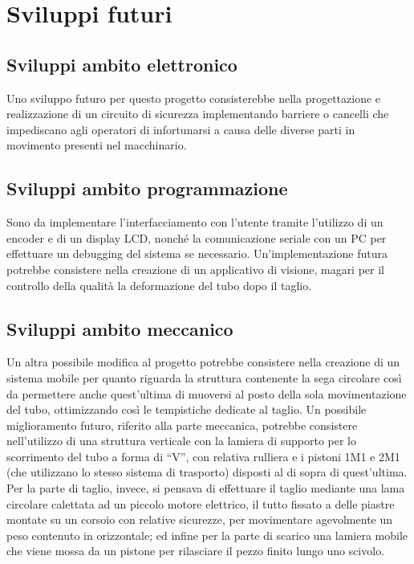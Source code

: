 \documentclass{report}
\begin{document}
\chapter{Sviluppi futuri}
\section{Sviluppi ambito elettronico}
  Uno sviluppo futuro per questo progetto consisterebbe nella progettazione e realizzazione di un circuito di sicurezza implementando barriere o cancelli che impediscano agli operatori di infortunarsi a causa delle diverse parti in movimento presenti nel macchinario.

\section{Sviluppi ambito programmazione} 
Sono da implementare l'interfacciamento con l'utente tramite l'utilizzo di un encoder e di un display LCD, nonché la comunicazione seriale con un PC per effettuare un debugging del sistema se necessario. Un'implementazione futura potrebbe consistere nella creazione di un applicativo di visione, magari per il controllo della qualità la deformazione del tubo dopo il taglio.
  
\section{Sviluppi ambito meccanico}  
  Un altra possibile modifica al progetto potrebbe consistere nella creazione di un sistema mobile per quanto riguarda la struttura contenente la sega circolare così da permettere anche quest'ultima di muoversi al posto della sola movimentazione del tubo, ottimizzando così le tempistiche dedicate al taglio.
  Un possibile miglioramento futuro, riferito alla parte meccanica, potrebbe consistere nell’utilizzo di una struttura verticale con la lamiera di supporto per lo scorrimento del tubo a forma di “V”, con relativa rulliera e i pistoni 1M1 e 2M1 (che utilizzano lo stesso sistema di trasporto) disposti al di sopra di quest’ultima. Per la parte di taglio, invece, si pensava di effettuare il taglio mediante una lama circolare calettata ad un piccolo motore elettrico, il tutto fissato a delle piastre montate su un corsoio con relative sicurezze, per movimentare agevolmente un peso contenuto in orizzontale; ed infine per la parte di scarico una lamiera mobile che viene mossa da un pistone per rilasciare il pezzo finito lungo uno scivolo.
\end{document}
